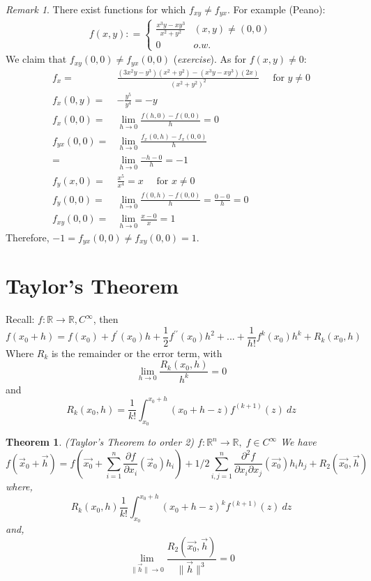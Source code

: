 \documentclass[12pt]{book}
\newtheorem{theorem}{Theorem}[section]
\theoremstyle{definition}
\theoremstyle{remark}
\newtheorem*{remark}{Remark}
\begin{document}
\begin{remark} 
  There exist functions for which $f_{xy} \neq f_{yx}$. For example (Peano): 
  \begin{equation*}
    \begin{split}
      f(x,y) : = \left\{ \begin{matrix}
        \frac{x^3y - xy^3}{x^2 + y^2} & (x,y) \neq (0,0) \\ 
        0 & o.w. 
      \end{matrix} \right.
    \end{split}
  \end{equation*}
  We claim that $f_{xy}( 0,0 ) \neq f_{yx} (0,0)$ (\textit{exercise}). As for $f(x,y) \neq 0$:
  \begin{equation*}
    \begin{split}
      f_x =& \frac{(3x^2 y  - y^3) (x^2 + y^2) - (x^3 y - xy^3)(2x)}{(x^2 + y^2)^2} \quad \text{ for } y \neq 0\\ 
      f_x(0, y) =& - \frac{y^5}{y^4} = -y \\ 
      f_x(0,0) =& \lim_{h \to 0} \frac{f(h,0) - f(0,0)}{h} = 0  \\ 
      f_{yx}(0,0) =& \lim_{h \to 0} \frac{f_x(0,h) - f_x(0,0)}{h} \\ 
      =& \lim_{h \to 0} \frac{-h - 0}{h} = - 1 \\ 
      f_{y}(x,0) =& \frac{x^5}{x^4} = x \quad \text{ for } x \neq 0 \\ 
      f_y(0,0) =& \lim_{h \to 0} \frac{f(0,h) - f(0,0)}{h} = \frac{0-0}{h} = 0 \\ 
      f_{xy} (0,0) =& \lim_{h \to 0} \frac{x-0}{x} = 1 
    \end{split}
  \end{equation*}
  Therefore, $-1 = f_{yx}(0,0) \neq f_{xy}(0,0) = 1.$
\end{remark}
\section{Taylor's Theorem}%
  \label{sub:Name}
  Recall: $f: \mathbb{R} \rightarrow \mathbb{R} , C^\infty$, then 
  $$f(x_0 + h ) = f(x_0) + f^\prime (x_0) h +\frac{1}{2} f^{\prime \prime } (x_0)h^2 + ... + \frac{1}{h!} f^k (x_0) h^k + R_k (x_0, h) $$
  Where $R_k$ is the remainder or the error term, with 
  $$\lim_{h \rightarrow 0} \frac{R_k(x_0 , h)}{h^k} = 0 
  $$
  and $$R_k (x_0, h ) =\frac{1}{k!} \int_{{x_0}}^{{x_0 + h}} {(x_0 + h -z ) f^{(k+1)} (z)} \: d{z} {}   $$
  
\begin{theorem} (Taylor's Theorem to order 2) $f: \mathbb{R}^n \rightarrow \mathbb{R}, \; f\in C^\infty $
  \newline 
  We have$$ f( \vec{{x}}_0 + \vec{{h}}  ) = f(\vec{{x_0}} +\sum^{n}_{i=1} \frac{\partial {f}}{\partial {x_i}} {(\vec{{x}}_0) h_i}) + 1/2 \sum^{n}_{i,j = 1} \frac{\partial^2 {f}}{\partial {x_i} \partial {x_j}} (\vec{{x}_0})h_i h_j + R_2 (\vec{{x_0}} , \vec{{h}}) $$
  where, 
  $$R_k(x_0 , h ) \frac{1}{k!} \int_{{x_0}}^{{x_0+h}} (x_0 +h -z)^k f^{(k+1)} (z) \: d{z} {}  $$ 
  and, 
  $$
  \lim_{\| \vec{{h}} \| \rightarrow 0 } \frac{R_2(\vec{{x_0}} ,\vec{{h}} )}{\| \vec{{h}} \|^3} = 0  
$$
\end{theorem}
\end{document}
